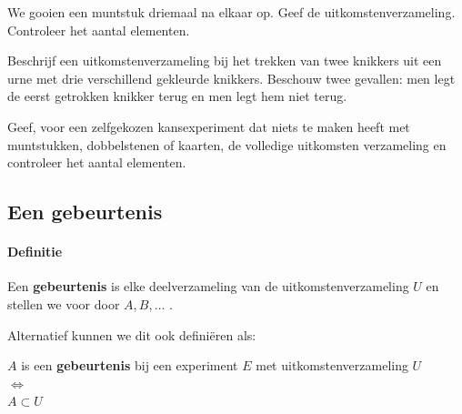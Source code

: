 \documentclass[12pt,a4paper,twoside]{article}
\begin{document}
\begin{oefening}
We gooien een muntstuk driemaal na elkaar op. Geef de uitkomstenverzameling. Controleer het aantal elementen.
\end{oefening}

\begin{oefening}
Beschrijf een uitkomstenverzameling bij het trekken van twee knikkers uit een urne met drie verschillend gekleurde knikkers. Beschouw twee gevallen: men legt de eerst getrokken knikker terug en men legt hem niet terug.
\end{oefening}

\begin{oefening}
Geef, voor een zelfgekozen kansexperiment dat niets te maken heeft met muntstukken, dobbelstenen of kaarten, de volledige uitkomsten verzameling en controleer het aantal elementen.
\end{oefening}

\subsection{Een gebeurtenis}

\paragraph*{Definitie} Een {\bf gebeurtenis} is elke deelverzameling van de uitkomstenverzameling $U$ en stellen we voor door $A, B, \ldots$ .

Alternatief kunnen we dit ook definiëren als:\\
\begin{mdframed}
\begin{center}
$A$ is een {\bf gebeurtenis} bij een experiment $E$ met uitkomstenverzameling $U$\\
$\Leftrightarrow$\\
$A\subset U$
\end{center}
\end{mdframed}
\end{document}
